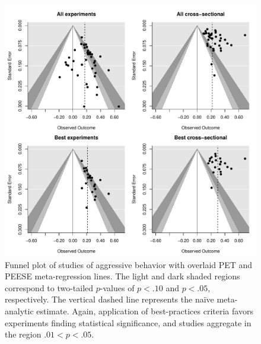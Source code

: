 \documentclass[man]{apa6}
\begin{document}
\begin{figure}
	\includegraphics[width = \textwidth, keepaspectratio]{funnels-0_AggBeh.pdf}
	\caption{Funnel plot of studies of aggressive behavior with overlaid PET and PEESE meta-regression lines. The light and dark shaded regions correspond to two-tailed $p$-values of $p < .10$ and $p < .05$, respectively. The vertical dashed line represents the na{\"i}ve meta-analytic estimate. Again, application of best-practices criteria favors experiments finding statistical significance, and studies aggregate in the region $.01 < p < .05$.}
	\label{funnel-aggbeh}
\end{figure}
\end{document}
